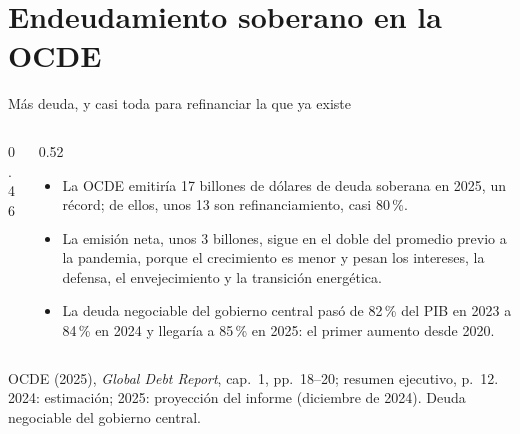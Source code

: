 \documentclass[aspectratio=169,11pt]{beamer}
\newcommand{\fuente}[1]{\par\vfill{\small\color{cGris}#1\par}}
\newcommand{\GDR}{OCDE (2025), \emph{Global Debt Report}}
\begin{document}
\section{Endeudamiento soberano en la OCDE}

\begin{frame}{Más deuda, y casi toda para refinanciar la que ya existe}
  \begin{columns}[T]
    \begin{column}{0.46\textwidth}
    \end{column}
    \begin{column}{0.52\textwidth}
      \begin{itemize}
        \item<1-> La OCDE emitiría 17 billones de dólares de deuda soberana en 2025, un récord; de ellos, unos 13 son refinanciamiento, casi 80\,\%.
        \item<2-> La emisión neta, unos 3 billones, sigue en el doble del promedio previo a la pandemia, porque el crecimiento es menor y pesan los intereses, la defensa, el envejecimiento y la transición energética.
        \item<3-> La deuda negociable del gobierno central pasó de 82\,\% del PIB en 2023 a 84\,\% en 2024 y llegaría a 85\,\% en 2025: el primer aumento desde 2020.
      \end{itemize}
    \end{column}
  \end{columns}
  \fuente{\GDR, cap.~1, pp.~18--20; resumen ejecutivo, p.~12. 2024: estimación; 2025: proyección del informe (diciembre de 2024). Deuda negociable del gobierno central.}
\end{frame}
\end{document}
